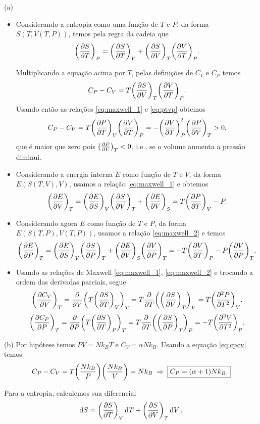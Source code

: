 \documentclass[a4paper,10pt]{article}
\begin{document}
(a)
\begin{itemize}
\item Considerando a entropia como uma função de $T$ e $P$, da forma $S(T, V(T, P))$, temos pela regra da cadeia que
$$
\qty(\pdv{S}{T})_{P} = \qty(\pdv{S}{T})_{V} + \qty(\pdv{S}{V})_{T} \qty(\pdv{V}{T})_{P}.
$$

Multiplicando a equação acima por $T$, pelas definições de $C_V$ e $C_P$ temos
$$
C_P - C_V = T \qty(\pdv{S}{V})_{T} \qty(\pdv{V}{T})_{P}.
$$
Usando então as relações \ref{eq:maxwell_1} e \ref{eq:ptvp} obtemos
\begin{equation} \label{eq:cpcv}
C_P - C_V = T \qty(\pdv{P}{T})_{V} \qty(\pdv{V}{T})_{P} = - \qty(\pdv{V}{T})_{P}^2 \qty(\pdv{P}{V})_{T} > 0,
\end{equation}
que é maior que zero pois $\qty(\pdv{P}{V})_{T} < 0$, i.e., se o volume aumenta a pressão diminui.

\n

\item Considerando a energia interna $E$ como função de $T$ e $V$, da forma $E(S(T,V), V)$, usamos a relação \ref{eq:maxwell_1} e obtemos
$$
\qty(\pdv{E}{V})_{T} = \qty(\pdv{E}{S})_{V} \qty(\pdv{S}{V})_{T} + \qty(\pdv{E}{V})_{S} = T \qty(\pdv{P}{T})_{V} - P.
$$

\n

\item Considerando agora $E$ como função de $T$ e $P$, da forma $E(S(T,P), V(T,P))$, usamos a relação \ref{eq:maxwell_2} e temos
$$
\qty(\pdv{E}{P})_{T} = \qty(\pdv{E}{S})_{V} \qty(\pdv{S}{P})_{T} + \qty(\pdv{E}{V})_{S} \qty(\pdv{V}{P})_{T} = - T \qty(\pdv{V}{T})_{P} - P \qty(\pdv{V}{P})_{T}.
$$

\n

\item Usando as relações de Maxwell \ref{eq:maxwell_1}, \ref{eq:maxwell_2} e trocando a ordem das derivadas parciais, segue
$$
\qty(\pdv{C_V}{V})_{T} = \pdv{V} \qty(T \qty(\pdv{S}{T})_{V})_T = T \pdv{T} \qty(\qty(\pdv{S}{V})_{T})_V = T \qty(\pdv[2]{P}{T})_V.
$$
$$
\qty(\pdv{C_P}{P})_{T} = \pdv{P} \qty(T \qty(\pdv{S}{T})_{P})_T = T \pdv{T} \qty(\qty(\pdv{S}{P})_{T})_P = -T \qty(\pdv[2]{V}{T})_P.
$$
\end{itemize}

\n\n\n\n

(b) Por hipótese temos $PV = N k_B T$ e $C_V = \alpha N k_B$. Usando a equação \ref{eq:cpcv} temos
$$
C_P - C_V = T \qty(\frac{N k_B}{P}) \qty(\frac{N k_B}{V}) = N k_B \; \Rightarrow \; \boxed{ C_P = (\alpha + 1) N k_B. }
$$

Para a entropia, calculemos sua diferencial
$$
\dd{S} = \qty(\pdv{S}{T})_{V} \dd{T} + \qty(\pdv{S}{V})_{T} \dd{V}.
$$
\end{document}
